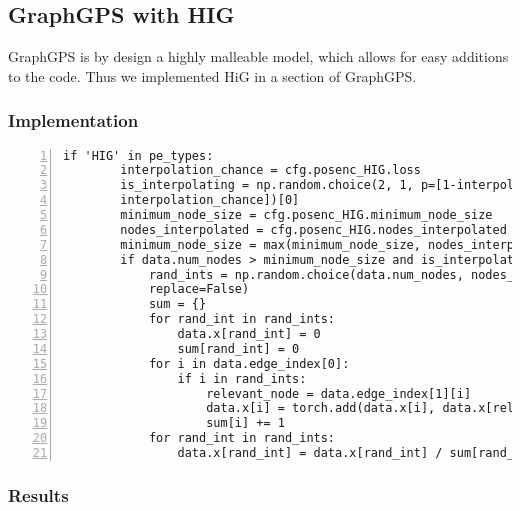 \subsection{GraphGPS with HIG}
GraphGPS is by design a highly malleable model, which allows for easy additions to the code. Thus we implemented HiG in a section of GraphGPS.


\subsubsection{Implementation}

\begin{lstlisting}[style=cpp,caption={HiG-Code in GraphGPS},label={lst:Void},numbers=left]
    if 'HIG' in pe_types:
        interpolation_chance = cfg.posenc_HIG.loss
        is_interpolating = np.random.choice(2, 1, p=[1-interpolation_chance, 
		interpolation_chance])[0]
        minimum_node_size = cfg.posenc_HIG.minimum_node_size
        nodes_interpolated = cfg.posenc_HIG.nodes_interpolated
        minimum_node_size = max(minimum_node_size, nodes_interpolated)
        if data.num_nodes > minimum_node_size and is_interpolating == 1:
            rand_ints = np.random.choice(data.num_nodes, nodes_interpolated, 
	    	replace=False)
            sum = {}
            for rand_int in rand_ints:
                data.x[rand_int] = 0
                sum[rand_int] = 0
            for i in data.edge_index[0]:
                if i in rand_ints:
                    relevant_node = data.edge_index[1][i]
                    data.x[i] = torch.add(data.x[i], data.x[relevant_node])
                    sum[i] += 1
            for rand_int in rand_ints:
                data.x[rand_int] = data.x[rand_int] / sum[rand_int]
\end{lstlisting}

\subsubsection{Results}

